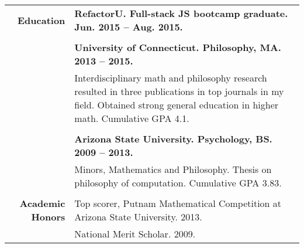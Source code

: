 \documentclass{article}
\begin{document}
\begin{tabular}{rl}
  {\bf Education} & {\bf RefactorU. Full-stack JS bootcamp graduate. Jun. 2015 -- Aug. 2015.} \\ \\
  & {\bf University of Connecticut. Philosophy, MA. 2013 -- 2015.} \\
  & \parbox{4.5in}{Interdisciplinary math and philosophy research resulted in three publications in top journals in my field. Obtained strong general education in higher math. Cumulative GPA 4.1.} \\ \\

  & {\bf Arizona State University. Psychology, BS. 2009 -- 2013.} \\
  & \parbox{4.5in}{Minors, Mathematics and Philosophy. Thesis on philosophy of computation. Cumulative GPA 3.83.} \\ \\



  {\bf Academic Honors} & Top scorer, Putnam Mathematical Competition at Arizona State University. 2013. \\
   & National Merit Scholar. 2009.
\end{tabular}
\egroup
\end{document}
